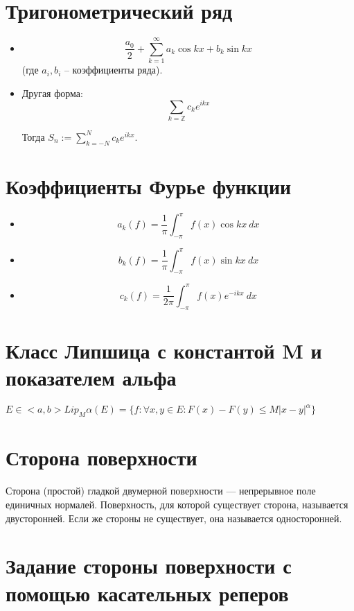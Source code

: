 	\section{Тригонометрический ряд}

	\begin{itemize}
		\item $$ \frac{a_0}{2}  + \sum_{k = 1}^{\infty} a_k\cos kx + b_k\sin kx $$
		(где $ a_i, b_i $ -- коэффициенты ряда).

		\item Другая форма:	$$ \sum_{k = \mathbb{Z}} c_k e^{ikx} $$

		Тогда $ S_n := \sum_{k = -N}^{N} c_k e^{ikx} $.
	\end{itemize}

	\section{Коэффициенты Фурье функции}

	\begin{itemize}
		\item $$ a_k(f) = \frac{1}{\pi} \int_{-\pi}^{\pi} f(x) \cos kx ~ dx $$

		\item $$ b_k(f) = \frac{1}{\pi} \int_{-\pi}^{\pi} f(x) \sin kx ~ dx $$

		\item $$ c_k(f) = \frac{1}{2\pi} \int_{-\pi}^{\pi} f(x) e^{-ikx} ~ dx $$

	\end{itemize}

    \section{Класс Липшица с константой M и показателем альфа}
    $E \in <a, b>   Lip_M \alpha(E) = \{f: \forall x,y \in E : F(x) - F(y) \leq M|x-y|^\alpha\}$

	\section{Сторона поверхности}

	Сторона (простой) гладкой двумерной поверхности {{---}} непрерывное поле единичных нормалей. Поверхность, для которой существует сторона, называется двусторонней. Если же стороны не существует, она называется односторонней.


	\section{Задание стороны поверхности с помощью касательных реперов}

